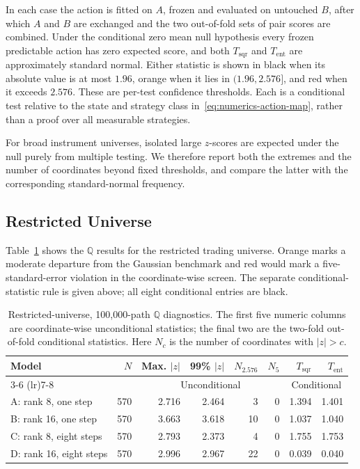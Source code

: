 \documentclass[11pt]{article}
\newcommand{\Q}{\mathbb Q}
\newcommand{\abs}[1]{\lvert #1\rvert}
\theoremstyle{plain}
\theoremstyle{definition}
\theoremstyle{remark}
\begin{document}
In each case the action is fitted on $A$, frozen and evaluated on untouched
$B$, after which $A$ and $B$ are exchanged and the two out-of-fold sets of
pair scores are combined.  Under the conditional zero mean null hypothesis
every frozen predictable action has zero expected score, and both
$T_{\mathrm{sqr}}$ and $T_{\mathrm{ent}}$ are approximately standard normal.
Either statistic is shown in black when its absolute value is at most $1.96$,
orange when it lies in $(1.96,2.576]$, and red when it exceeds $2.576$.
These are per-test confidence thresholds.  Each is a conditional test relative
to the state and strategy class in~\eqref{eq:numerics-action-map}, rather than
a proof over all measurable strategies.

For broad instrument universes, isolated large $z$-scores are expected under
the null purely from multiple testing.  We therefore report both the extremes
and the number of coordinates beyond fixed thresholds, and compare the latter
with the corresponding standard-normal frequency.

\subsection{Restricted Universe}

Table~\ref{tab:numerics-restricted-q} shows the $\Q$ results for the restricted
trading universe.  Orange marks a moderate departure from the Gaussian
benchmark and red would mark a five-standard-error violation in the
coordinate-wise screen.  The separate conditional-statistic rule is given
above; all eight conditional entries are black.

\begin{table}[H]
\centering
\small
\begin{tabular}{lrrrrrrr}
\toprule
Model & $N$ & Max. $\abs{z}$ & 99\% $\abs{z}$
  & $N_{2.576}$ & $N_5$ & $T_{\mathrm{sqr}}$ & $T_{\mathrm{ent}}$\\
\cmidrule(lr){3-6}
\cmidrule(lr){7-8}
 & & \multicolumn{4}{c}{Unconditional} & \multicolumn{2}{c}{Conditional}\\
\midrule
A: rank 8, one step    & 570 & 2.716 & 2.464 &  3 & 0 & 1.394 & 1.401\\
B: rank 16, one step   & 570 & {\color{orange}3.663} & {\color{orange}3.618}
  & {\color{orange}10} & 0 & 1.037 & 1.040\\
C: rank 8, eight steps & 570 & 2.793 & 2.373 &  4 & 0 & 1.755 & 1.753\\
D: rank 16, eight steps& 570 & 2.996 & {\color{orange}2.967}
  & {\color{orange}22} & 0 & 0.039 & 0.040\\
\bottomrule
\end{tabular}
\caption{Restricted-universe, 100,000-path $\Q$ diagnostics.  The first five
numeric columns are coordinate-wise unconditional statistics; the final two
are the two-fold out-of-fold conditional statistics.  Here $N_c$ is the number
of coordinates with $\abs{z}>c$.}
\label{tab:numerics-restricted-q}
\end{table}
\end{document}
